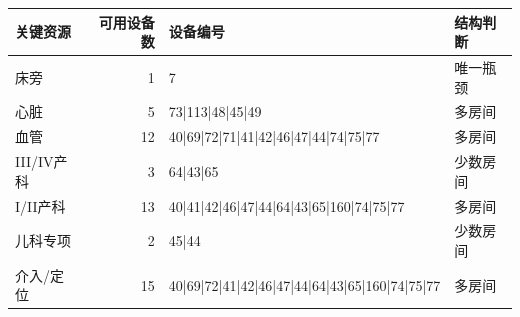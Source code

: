 \begin{tabularx}{\textwidth}{l r X l}
\toprule
关键资源 & 可用设备数 & 设备编号 & 结构判断 \\
\midrule
床旁 & 1 & 7 & 唯一瓶颈 \\
心脏 & 5 & 73|113|48|45|49 & 多房间 \\
血管 & 12 & 40|69|72|71|41|42|46|47|44|74|75|77 & 多房间 \\
III/IV产科 & 3 & 64|43|65 & 少数房间 \\
I/II产科 & 13 & 40|41|42|46|47|44|64|43|65|160|74|75|77 & 多房间 \\
儿科专项 & 2 & 45|44 & 少数房间 \\
介入/定位 & 15 & 40|69|72|41|42|46|47|44|64|43|65|160|74|75|77 & 多房间 \\
\bottomrule
\end{tabularx}
